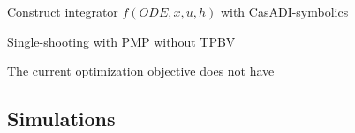 \begin{algorithm}[H]
\SetAlgoLined
{}
Construct integrator $f(ODE, x, u, h)$ with CasADI-symbolics\\
 \caption{Single-shooting with PMP without TPBV}
 \label{alg:SingleShooting_Integration_PMP}
\end{algorithm}

The current optimization objective does not have 



\subsection{Simulations}





